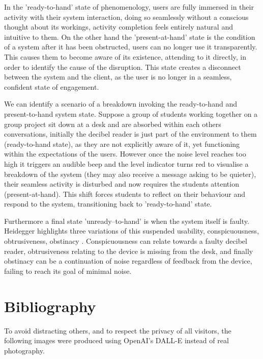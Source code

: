 \documentclass{novel}
\begin{document}
In the 'ready-to-hand' state of phenomenology, users are fully immersed in their activity with their system interaction, doing so seamlessly without a conscious thought about its workings, activity completion feels entirely natural and intuitive to them. On the other hand the 'present-at-hand' state is the condition of a system after it has been obstructed, users can no longer use it transparently. This causes them to become aware of its existence, attending to it directly, in order to identify the cause of the disruption. This state creates a disconnect between the system and the client, as the user is no longer in a seamless, confident state of engagement.

We can identify a scenario of a breakdown invoking the ready-to-hand and present-to-hand system state. Suppose a group of students working together on a group project sit down at a desk and are absorbed within each others conversations, initially the decibel reader is just part of the environment to them (ready-to-hand state), as they are not explicitly aware of it, yet functioning within the expectations of the users. However once the noise level reaches too high it triggers an audible beep and the level indicator turns red to visualise a breakdown of the system (they may also receive a message asking to be quieter), their seamless activity is disturbed and now requires the students attention (present-at-hand). This shift forces students to reflect on their behaviour and respond to the system, transitioning back to 'ready-to-hand' state.

Furthermore a final state 'unready–to-hand' is when the system itself is faulty. Heidegger highlights three variations of this suspended usability, conspicuousness, obtrusiveness, obstinacy \citep{maybe_unready--hand_2019}. Conspicuousness can relate towards a faulty decibel reader, obtrusiveness relating to the device is missing from the desk, and finally obstinacy can be a continuation of noise regardless of feedback from the device, failing to reach its goal of minimal noise.


\chapter{Bibliography}
\renewcommand{\bibsection}{\hhh{\refname}}



\clearpage

\noindent
\centering
To avoid distracting others, and to respect the privacy of all visitors, the following images were produced using OpenAI's DALL-E instead of real photography.
\end{document}
